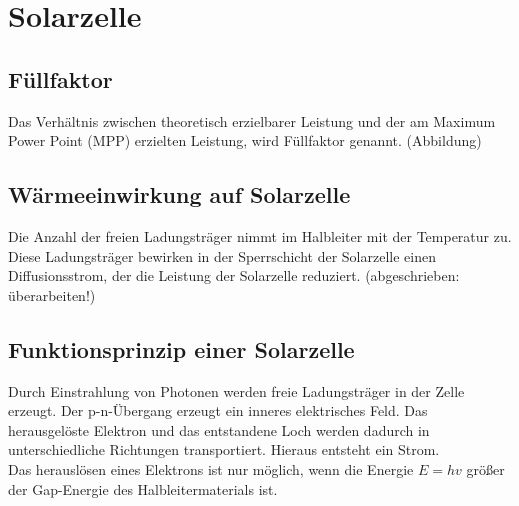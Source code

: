\section{Solarzelle}

\subsection*{Füllfaktor}
Das Verhältnis zwischen theoretisch erzielbarer Leistung und der am Maximum Power Point (MPP) erzielten Leistung, wird Füllfaktor genannt. (Abbildung)

\subsection*{Wärmeeinwirkung auf Solarzelle}
Die Anzahl der freien Ladungsträger nimmt im Halbleiter mit der Temperatur zu. Diese Ladungsträger bewirken in der Sperrschicht der Solarzelle einen Diffusionsstrom, der die Leistung der Solarzelle reduziert.
(abgeschrieben: überarbeiten!)

\subsection*{Funktionsprinzip einer Solarzelle}
Durch Einstrahlung von Photonen werden freie Ladungsträger in der Zelle erzeugt. Der p-n-Übergang erzeugt ein inneres elektrisches Feld. Das herausgelöste Elektron und das entstandene Loch werden dadurch in unterschiedliche Richtungen transportiert. Hieraus entsteht ein Strom.\\
Das herauslösen eines Elektrons ist nur möglich, wenn die Energie $E=hv$ größer der Gap-Energie des Halbleitermaterials ist.
